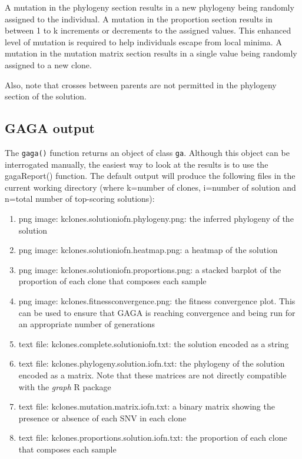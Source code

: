 \documentclass[a4paper]{article}\usepackage[]{graphicx}\usepackage[]{color}
\begin{document}
A mutation in the phylogeny section results in a new phylogeny being randomly assigned to the individual. A mutation in the proportion
section results in between 1 to {\color{icrred}k} increments or decrements to the assigned values.  This enhanced level of mutation
is required to help individuals escape from local minima.  A mutation in the mutation matrix section results in a single value being randomly assigned to a new clone.

Also, note that crosses between parents are not permitted in the phylogeny section of the solution.

\subsection{GAGA output}
The \texttt{gaga()} function returns an object of class \texttt{ga}.  Although this object can be interrogated manually, the easiest way to look at the results is to use the gagaReport() function.  The default output will produce the following files in the current working directory (where {\color{icrred}k}=number of clones, {\color{icrred}i}=number of solution and {\color{icrred}n}=total number of top-scoring solutions):

\begin{enumerate}
   \item png image: {\color{icrred}k}clones.solution{\color{icrred}i}of{\color{icrred}n}.phylogeny.png: the inferred phylogeny of the solution 
   \item png image: {\color{icrred}k}clones.solution{\color{icrred}i}of{\color{icrred}n}.heatmap.png: a heatmap of the solution
   \item png image: {\color{icrred}k}clones.solution{\color{icrred}i}of{\color{icrred}n}.proportions.png: a stacked barplot of the proportion of each clone that composes each sample
   \item png image: {\color{icrred}k}clones.fitnessconvergence.png: the fitness convergence plot.  This can be used to ensure that GAGA is reaching convergence and being run for an appropriate number of generations
   \item text file: {\color{icrred}k}clones.complete.solution{\color{icrred}i}of{\color{icrred}n}.txt: the solution encoded as a string
   \item text file: {\color{icrred}k}clones.phylogeny.solution.{\color{icrred}i}of{\color{icrred}n}.txt: the phylogeny of the solution
   encoded as a matrix.  Note that these matrices are not directly compatible with the \emph{graph} R package
   \item text file: {\color{icrred}k}clones.mutation.matrix.{\color{icrred}i}of{\color{icrred}n}.txt: a binary matrix showing the
   presence or absence of each SNV in each clone
   \item text file: {\color{icrred}k}clones.proportions.solution.{\color{icrred}i}of{\color{icrred}n}.txt: the proportion of each 
   clone that composes each sample
\end{enumerate}
\end{document}
